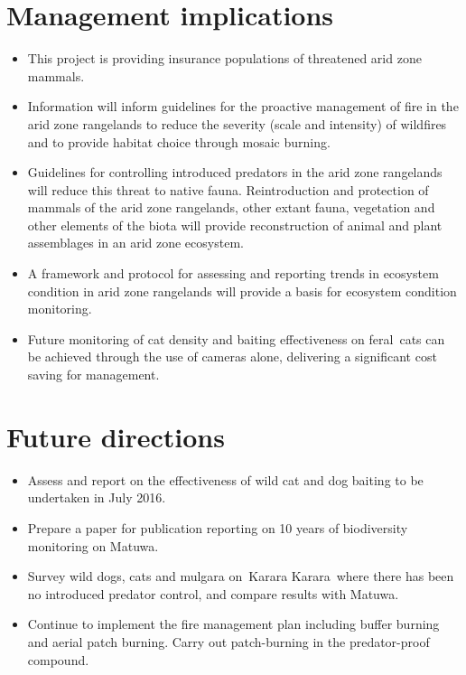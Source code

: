 \documentclass[version=last,
    paper=a4, %
    10pt, %
    usenames,
    dvipsnames,
    oneside, %
    headings=openany, %
    DIV=15 %
]{scrbook}
\begin{document}
\section*{Management implications}

\begin{itemize}
\itemsep1pt\parskip0pt
\item
  This project is providing insurance populations of threatened arid
  zone mammals.
\item
  Information will inform guidelines for the proactive management of
  fire in the arid zone rangelands to reduce the severity (scale and
  intensity) of wildfires and to provide habitat choice through mosaic
  burning.
\item
  Guidelines for controlling introduced predators in the arid zone
  rangelands will reduce this threat to native fauna. Reintroduction and
  protection of mammals of the arid zone rangelands, other extant fauna,
  vegetation and other elements of the biota will provide reconstruction
  of animal and plant assemblages in an arid zone ecosystem.
\item
  A framework and protocol for assessing and reporting trends in
  ecosystem condition in arid zone rangelands will provide a basis for
  ecosystem condition monitoring.
\item
  Future monitoring of cat density and baiting effectiveness on
  feral~cats can be achieved through the use of cameras alone,
  delivering a significant cost saving for management.
\end{itemize}




\section*{Future directions}

\begin{itemize}
\itemsep1pt\parskip0pt
\item
  Assess and report on the effectiveness of wild cat and dog baiting to
  be undertaken in July 2016.
\item
  Prepare a paper for publication reporting on 10 years of biodiversity
  monitoring on Matuwa.
\item
  Survey wild dogs, cats and mulgara on~Karara Karara~where there has
  been no introduced predator control, and compare results with Matuwa.
\item
  Continue to implement the fire management plan including buffer
  burning and aerial patch burning. Carry out patch-burning in the
  predator-proof compound.
\end{itemize}



\end{document}
